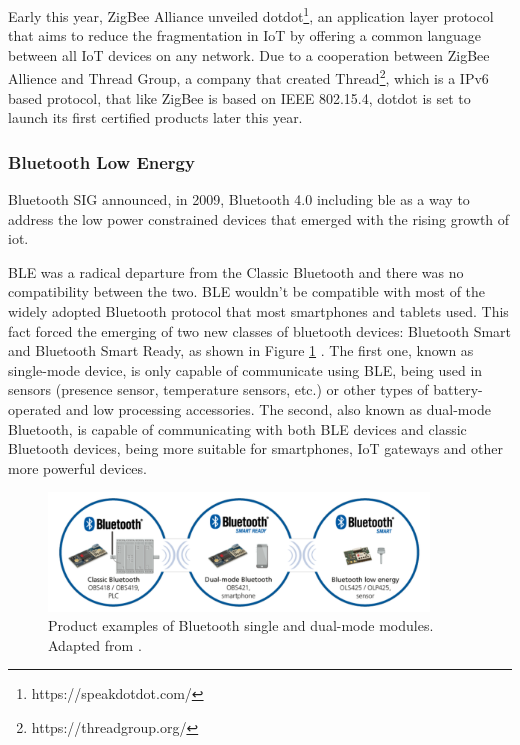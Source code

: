 Early this year, ZigBee Alliance unveiled dotdot\footnote{https://speakdotdot.com/}, an application layer protocol that aims to reduce the fragmentation in IoT by offering a common language between all IoT devices on any network. Due to a cooperation between ZigBee Allience and Thread Group, a company that created Thread\footnote{https://threadgroup.org/}, which is a IPv6 based protocol, that like ZigBee is based on IEEE 802.15.4, dotdot is set to launch its first certified products later this year.


\subsubsection{Bluetooth Low Energy}

Bluetooth SIG announced, in 2009, Bluetooth 4.0 including \acf{ble} as a way to address the low power constrained devices that emerged with the rising growth of \ac{iot}. 

BLE was a radical departure from the Classic Bluetooth and there was no compatibility between the two. BLE wouldn't be compatible with most of the widely adopted Bluetooth protocol that most smartphones and tablets used. This fact forced the emerging of two new classes of bluetooth devices: Bluetooth Smart and Bluetooth Smart Ready, as shown in Figure \ref{fig:ble1} \cite{Andersson2014}. The first one, known as single-mode device, is only capable of communicate using BLE, being used in sensors (presence sensor, temperature sensors, etc.) or other types of battery-operated and low processing accessories. The second, also known as dual-mode Bluetooth, is capable of communicating with both BLE devices and classic Bluetooth devices, being more suitable for smartphones, IoT gateways and other more powerful devices. 

\begin{figure}[H]
	\centering
	\includegraphics[width=0.9\textwidth]{figures/ble.png}
	\caption{Product examples of Bluetooth single and dual-mode modules. Adapted from \cite{Andersson2014}.}
	\label{fig:ble1}
\end{figure}

